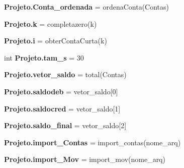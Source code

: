 \begin{DoxyCompactItemize}
\textbf{ Projeto.\+Conta\+\_\+ordenada} = ordena\+Conta(Contas)
\item 
\textbf{ Projeto.\+k} = completazero(k)
\item 
\textbf{ Projeto.\+i} = obter\+Conta\+Curta(k)
\item 
int \textbf{ Projeto.\+tam\+\_\+s} = 30
\item 
\textbf{ Projeto.\+vetor\+\_\+saldo} = total(Contas)
\item 
\textbf{ Projeto.\+saldodeb} = vetor\+\_\+saldo[0]
\item 
\textbf{ Projeto.\+saldocred} = vetor\+\_\+saldo[1]
\item 
\textbf{ Projeto.\+saldo\+\_\+final} = vetor\+\_\+saldo[2]
\item 
\textbf{ Projeto.\+import\+\_\+\+Contas} = import\+\_\+contas(nome\+\_\+arq)
\item 
\textbf{ Projeto.\+import\+\_\+\+Mov} = import\+\_\+mov(nome\+\_\+arq)
\end{DoxyCompactItemize}
